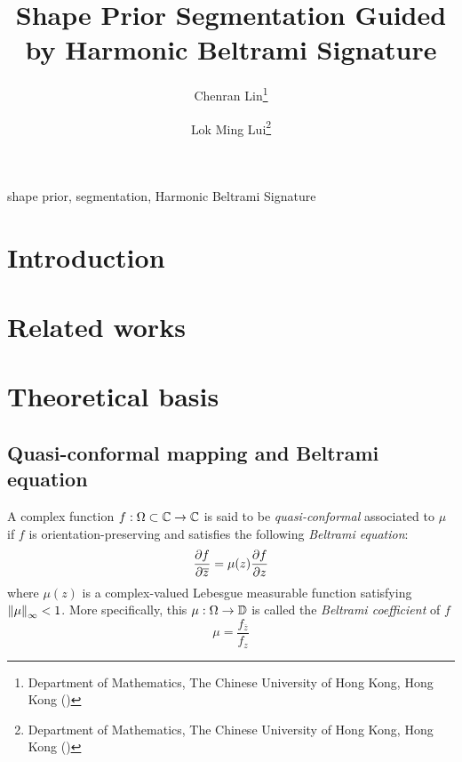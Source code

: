 \documentclass[review,onefignum,onetabnum]{siamonline190516}
\begin{document}
\title{Shape Prior Segmentation Guided by Harmonic Beltrami Signature}

\author{
    Chenran Lin\thanks{Department of Mathematics, The Chinese University of Hong Kong, Hong Kong ()}
    \and
    Lok Ming Lui\thanks{Department of Mathematics, The Chinese University of Hong Kong, Hong Kong ()}
}

\maketitle

\begin{abstract}
    
\end{abstract}

\begin{keywords}
    shape prior, segmentation, Harmonic Beltrami Signature
\end{keywords}

\section{Introduction}
\label{intro}


\section{Related works}\label{related work}


\section{Theoretical basis}\label{background}
\subsection{Quasi-conformal mapping and Beltrami equation}
A complex function $f: \Omega \subset \mathbb{C} \rightarrow \mathbb{C}$ is said to be \textit{quasi-conformal} associated to $\mu$ if $f$ is orientation-preserving and satisfies the following \textit{Beltrami equation}:
\begin{equation}\label{beltrami eq}
    \Part{f}{\overline{z}} = \mu(z) \Part{f}{z}
\end{equation}
where $\mu(z)$ is a complex-valued Lebesgue measurable function satisfying $\left\Vert \mu \right\Vert_\infty < 1$. More specifically, this $\mu: \Omega \rightarrow \mathbb{D}$ is called the \textit{Beltrami coefficient} of $f$
\begin{equation}\label{mu def}
    \mu = \frac{f_{\overline{z}}}{f_{z}}
\end{equation}
\end{document}
